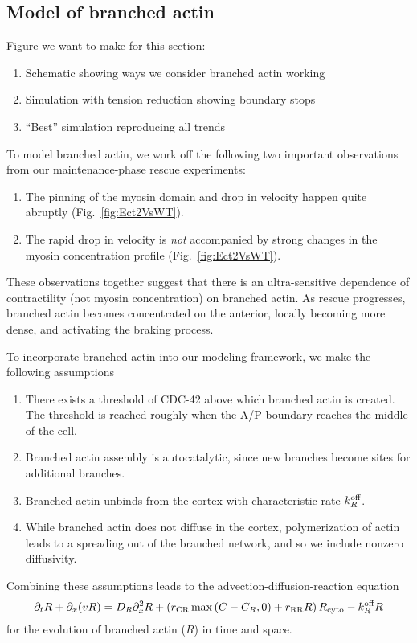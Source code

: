 \documentclass[11pt]{article}
\newcommand{\red}[1]{\color{red}#1\normalcolor}
\newcommand{\6}[1]{#1_{\text{6}}}
\newcommand{\3}[1]{#1_{\text{3}}}
\begin{document}
\subsection{Model of branched actin}
\red{Figure we want to make for this section:
\begin{enumerate}[label=(\alph*),topsep=0pt,itemsep=-2ex]
\item Schematic showing ways we consider branched actin working
\item Simulation with tension reduction showing boundary stops
\item ``Best'' simulation reproducing all trends
\end{enumerate}
}


To model branched actin, we work off the following two important observations from our maintenance-phase rescue experiments:
\begin{enumerate}
\item The pinning of the myosin domain and drop in velocity happen quite abruptly (Fig.\ \ref{fig:Ect2VsWT}). 
\item The rapid drop in velocity is \emph{not} accompanied by strong changes in the myosin concentration profile (Fig.\ \ref{fig:Ect2VsWT}).
\end{enumerate}
These observations together suggest that there is an ultra-sensitive dependence of contractility (not myosin concentration) on branched actin. As rescue progresses, branched actin becomes concentrated on the anterior, locally becoming more dense, and activating the braking process. 

To incorporate branched actin into our modeling framework, we make the following assumptions
\begin{enumerate}
\item There exists a threshold of CDC-42 above which branched actin is created. The threshold is reached roughly when the A/P boundary reaches the middle of the cell.
\item Branched actin assembly is autocatalytic, since new branches become sites for additional branches.
\item Branched actin unbinds from the cortex with characteristic rate $k^\text{off}_R$. 
\item While branched actin does not diffuse in the cortex, polymerization of actin leads to a spreading out of the branched network, and so we include nonzero diffusivity. 
\end{enumerate}
Combining these assumptions leads to the advection-diffusion-reaction equation
\begin{equation}
\label{eq:BA}
\partial_t R + \partial_x (v R) =  D_R \partial_x^2 R + \left(r_\text{CR}\max{\left(C-C_R,0\right)}+r_\text{RR} R\right) R_\text{cyto}-k^\text{off}_R R
\end{equation}
for the evolution of branched actin ($R$) in time and space.
\end{document}
